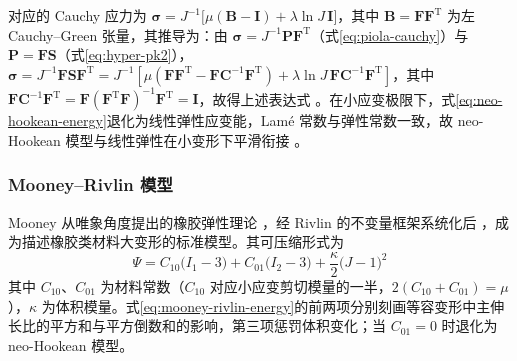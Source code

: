 对应的 Cauchy 应力为 $\boldsymbol{\sigma}=J^{-1}\bigl[\mu(\mathbf{B}-\mathbf{I})+\lambda\ln J\,\mathbf{I}\bigr]$，其中 $\mathbf{B}=\mathbf{F}\mathbf{F}^{\mathrm{T}}$ 为左 Cauchy--Green 张量，其推导为：由 $\boldsymbol{\sigma}=J^{-1}\mathbf{P}\mathbf{F}^{\mathrm{T}}$（式\eqref{eq:piola-cauchy}）与 $\mathbf{P}=\mathbf{F}\mathbf{S}$（式\eqref{eq:hyper-pk2}），$\boldsymbol{\sigma}=J^{-1}\mathbf{F}\mathbf{S}\mathbf{F}^{\mathrm{T}}=J^{-1}[\mu(\mathbf{F}\mathbf{F}^{\mathrm{T}}-\mathbf{F}\mathbf{C}^{-1}\mathbf{F}^{\mathrm{T}})+\lambda\ln J\,\mathbf{F}\mathbf{C}^{-1}\mathbf{F}^{\mathrm{T}}]$，其中 $\mathbf{F}\mathbf{C}^{-1}\mathbf{F}^{\mathrm{T}}=\mathbf{F}(\mathbf{F}^{\mathrm{T}}\mathbf{F})^{-1}\mathbf{F}^{\mathrm{T}}=\mathbf{I}$，故得上述表达式 \cite{Ogden1997}。在小应变极限下，式\eqref{eq:neo-hookean-energy}退化为线性弹性应变能，Lam\'e 常数与弹性常数一致，故 neo-Hookean 模型与线性弹性在小变形下平滑衔接 \cite{Ogden1997,Treloar1943}。

\subsubsection{Mooney--Rivlin 模型}

Mooney 从唯象角度提出的橡胶弹性理论 \cite{Mooney1940}，经 Rivlin 的不变量框架系统化后 \cite{Rivlin1948}，成为描述橡胶类材料大变形的标准模型。其可压缩形式为
\begin{equation}
  \Psi=C_{10}\bigl(I_1-3\bigr)+C_{01}\bigl(I_2-3\bigr)
  +\frac{\kappa}{2}\bigl(J-1\bigr)^{2}
  \label{eq:mooney-rivlin-energy}
\end{equation}
其中 $C_{10}$、$C_{01}$ 为材料常数（$C_{10}$ 对应小应变剪切模量的一半，$2(C_{10}+C_{01})=\mu$），$\kappa$ 为体积模量。式\eqref{eq:mooney-rivlin-energy}的前两项分别刻画等容变形中主伸长比的平方和与平方倒数和的影响，第三项惩罚体积变化；当 $C_{01}=0$ 时退化为 neo-Hookean 模型。

